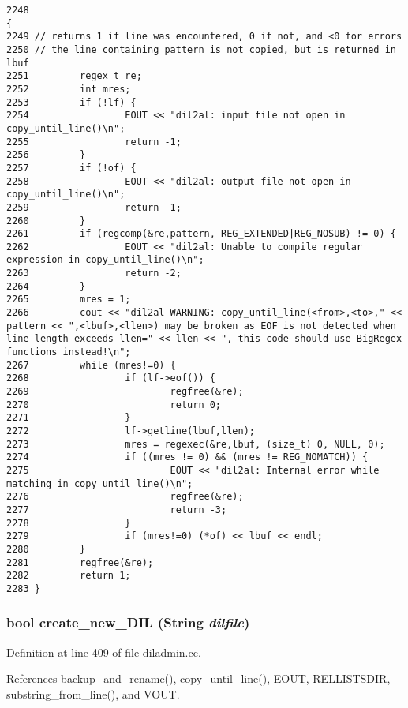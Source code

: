 \footnotesize\begin{verbatim}2248                                                                                                {
2249 // returns 1 if line was encountered, 0 if not, and <0 for errors
2250 // the line containing pattern is not copied, but is returned in lbuf
2251         regex_t re;
2252         int mres;
2253         if (!lf) {
2254                 EOUT << "dil2al: input file not open in copy_until_line()\n";
2255                 return -1;
2256         }
2257         if (!of) {
2258                 EOUT << "dil2al: output file not open in copy_until_line()\n";
2259                 return -1;
2260         }
2261         if (regcomp(&re,pattern, REG_EXTENDED|REG_NOSUB) != 0) {
2262                 EOUT << "dil2al: Unable to compile regular expression in copy_until_line()\n";
2263                 return -2;
2264         }
2265         mres = 1;
2266         cout << "dil2al WARNING: copy_until_line(<from>,<to>," << pattern << ",<lbuf>,<llen>) may be broken as EOF is not detected when line length exceeds llen=" << llen << ", this code should use BigRegex functions instead!\n";
2267         while (mres!=0) {
2268                 if (lf->eof()) {
2269                         regfree(&re);
2270                         return 0;
2271                 }
2272                 lf->getline(lbuf,llen);
2273                 mres = regexec(&re,lbuf, (size_t) 0, NULL, 0);
2274                 if ((mres != 0) && (mres != REG_NOMATCH)) {
2275                         EOUT << "dil2al: Internal error while matching in copy_until_line()\n";
2276                         regfree(&re);
2277                         return -3;
2278                 }
2279                 if (mres!=0) (*of) << lbuf << endl;
2280         }
2281         regfree(&re);
2282         return 1;
2283 }
\end{verbatim}\normalsize 
{}
\subsubsection{\setlength{\rightskip}{0pt plus 5cm}bool create\_\-new\_\-DIL ({\bf String} {\em dilfile})}\label{dil2al_8hh_a299}




Definition at line 409 of file diladmin.cc.

References backup\_\-and\_\-rename(), copy\_\-until\_\-line(), EOUT, RELLISTSDIR, substring\_\-from\_\-line(), and VOUT.

